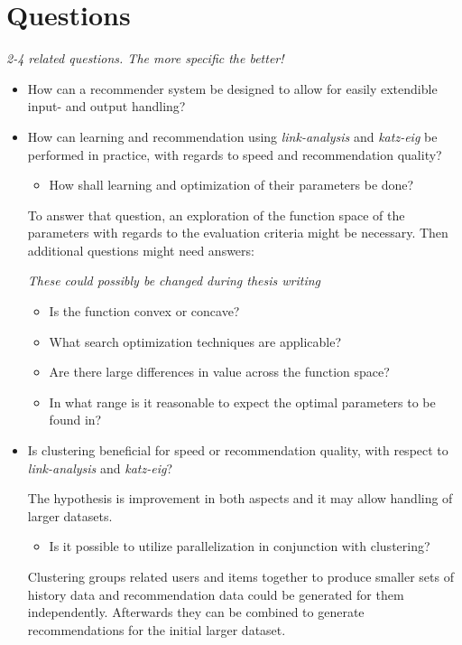 
\section{Questions}\label{sec:intro:questions}

\textit{2-4 related questions. The more specific the better!}

\begin{itemize}

    \item How can a recommender system be designed to allow for easily extendible input- and output handling?


    \item How can learning and recommendation using \textit{link-analysis} and \textit{katz-eig} be performed in practice, with regards to speed and recommendation quality?

        \begin{itemize}
            \item How shall learning and optimization of their parameters be done?
        \end{itemize}

        To answer that question, an exploration of the function space of the parameters with regards to the evaluation criteria might be necessary. Then additional questions might need answers:

        \textit{These could possibly be changed during thesis writing}

        \begin{itemize}
            \item Is the function convex or concave?
            \item What search optimization techniques are applicable?
            \item Are there large differences in value across the function space?
            \item In what range is it reasonable to expect the optimal parameters to be found in?
        \end{itemize}


    \item Is clustering beneficial for speed or recommendation quality, with respect to \textit{link-analysis} and \textit{katz-eig}?

        The hypothesis is improvement in both aspects and it may allow handling of larger datasets.

        \begin{itemize}
            \item Is it possible to utilize parallelization in conjunction with clustering?
        \end{itemize}

        Clustering groups related users and items together to produce smaller sets of history data and recommendation data could be generated for them independently. Afterwards they can be combined to generate recommendations for the initial larger dataset.

\end{itemize}

